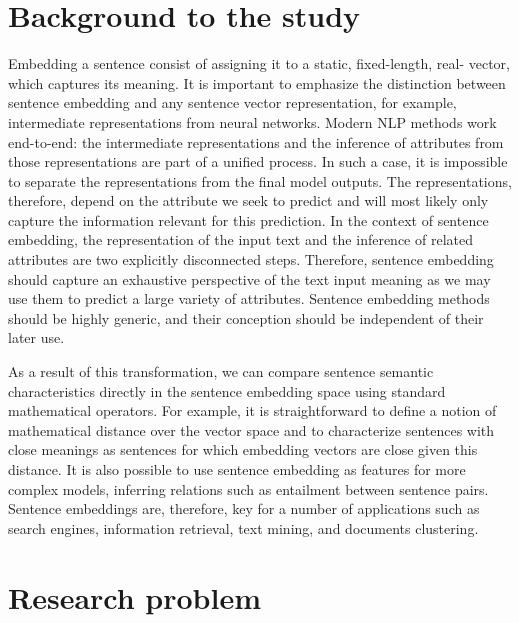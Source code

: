 
\section{Background to the study}

Embedding a sentence consist of assigning it to a static, fixed-length, real- vector, which captures its meaning. It is important to emphasize the distinction between sentence embedding and any sentence vector representation, for example, intermediate representations from neural networks.  Modern NLP methods work end-to-end: the intermediate representations and the inference of attributes from those representations are part of a unified process. In such a case, it is impossible to separate the representations from the final model outputs. The representations, therefore, depend on the attribute we seek to predict and will most likely only capture the information relevant for this prediction. In the context of sentence embedding, the representation of the input text and the inference of related attributes are two explicitly disconnected steps. Therefore, sentence embedding should capture an exhaustive perspective of the text input meaning as we may use them to predict a large variety of attributes. Sentence embedding methods should be highly generic, and their conception should be independent of their later use.

As a result of this transformation, we can compare sentence semantic characteristics directly in the sentence embedding space using standard mathematical operators. For example, it is straightforward to define a notion of mathematical distance over the vector space and to characterize sentences with close meanings as sentences for which embedding vectors are close given this distance. It is also possible to use sentence embedding as features for more complex models, inferring relations such as entailment between sentence pairs. Sentence embeddings are, therefore, key for a number of applications such as search engines, information retrieval, text mining, and documents clustering.



\section{Research problem}

